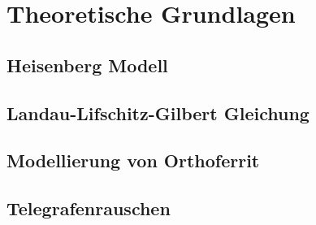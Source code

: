 \documentclass[main.tex]{subfiles}
\begin{document}
\section{Theoretische Grundlagen}

\subsection[short]{Heisenberg Modell}

\subsection[short]{Landau-Lifschitz-Gilbert Gleichung}

\subsection[short]{Modellierung von Orthoferrit}

\subsection[short]{Telegrafenrauschen}
\end{document}
